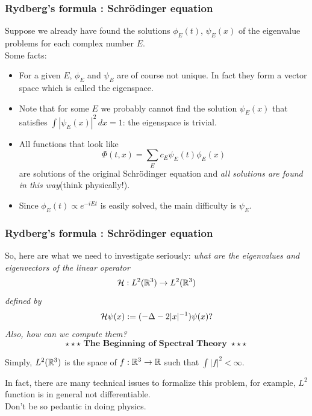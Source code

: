 \documentclass{beamer}
\begin{document}
\begin{frame}
\frametitle{Rydberg's formula : Schr\"odinger equation}
  Suppose we already have found the solutions $\phi_E(t)$, $\psi_E(x)$ of the eigenvalue problems for each complex number $E$.\\
  \pause Some facts:
  \pause
  \begin{itemize}[<+->]
    \item For a given $E$, $\phi_E$ and $\psi_E$ are of course not unique. In fact they form a vector space which is called the eigenspace.
    \item Note that for some $E$ we probably cannot find the solution $\psi_E(x)$ that satisfies $\int|\psi_E(x)|^2\,dx=1$: the eigenspace is trivial.
    \item All functions that look like \[\Phi(t,x)=\sum_Ec_E\psi_E(t)\phi_E(x)\] are solutions of the original Schr\"odinger equation and \emph{all solutions are found in this way}(think physically!).
    \item Since $\phi_E(t)\propto e^{-iEt}$ is easily solved, the main difficulty is $\psi_E$.
  \end{itemize}
\end{frame}

\begin{frame}
\frametitle{Rydberg's formula : Schr\"odinger equation}
  So, here are what we need to investigate seriously:
  \pause\emph{what are the eigenvalues and eigenvectors of the linear operator}
  \[\cH:L^2(\R^3)\to L^2(\R^3)\]
  \emph{defined by}
  \[\mathcal{H}\psi(x):=(-\Delta-2|x|^{-1})\psi(x)?\]
  \emph{Also, how can we compute them?}
  \pause \[\star\star\star\textbf{ The Beginning of Spectral Theory }\star\star\star\]
  \pause \vspace{-2em}
  \begin{rmk}
    Simply, $L^2(\mathbb{R}^3)$ is the space of $f:\R^3\to\R$ such that $\int|f|^2<\infty$.
  \end{rmk}
  \pause
  \begin{rmk}
    In fact, there are many technical issues to formalize this problem, for example, $L^2$ function is in general not differentiable.\\
    \pause Don't be so pedantic in doing physics.
  \end{rmk}
\end{frame}
\end{document}
